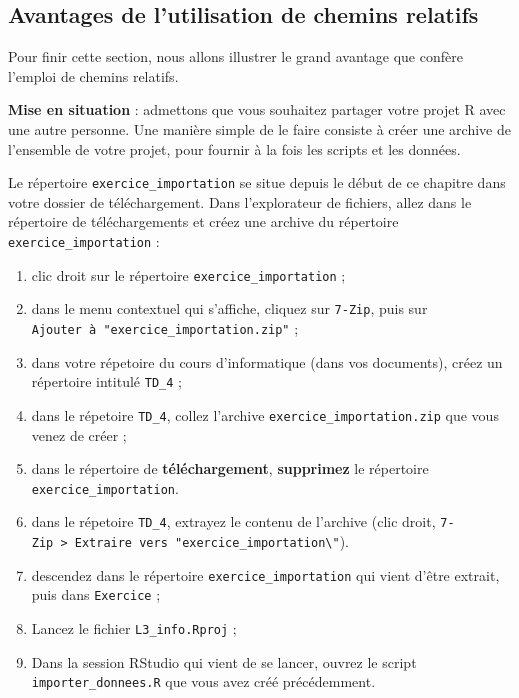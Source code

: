 \documentclass[
  11pt,
]{book}
\providecommand{\tightlist}{%
  \setlength{\itemsep}{0pt}\setlength{\parskip}{0pt}}
\numberwithin{equation}{section}
\numberwithin{countremarque}{section}
\newenvironment{greenbox}{
  \begin{tcolorbox}[breakable, colback=vert,coltext=black,
                  colframe=grisfonce]}
 {\end{tcolorbox}}
\begin{document}
\hypertarget{avantages-de-lutilisation-de-chemins-relatifs}{%
\subsection{Avantages de l'utilisation de chemins relatifs}\label{avantages-de-lutilisation-de-chemins-relatifs}}

Pour finir cette section, nous allons illustrer le grand avantage que confère l'emploi de chemins relatifs.

\textbf{Mise en situation} : admettons que vous souhaitez partager votre projet R avec une autre personne. Une manière simple de le faire consiste à créer une archive de l'ensemble de votre projet, pour fournir à la fois les scripts et les données.

Le répertoire \texttt{exercice\_importation} se situe depuis le début de ce chapitre dans votre dossier de téléchargement. Dans l'explorateur de fichiers, allez dans le répertoire de téléchargements et créez une archive du répertoire \texttt{exercice\_importation} :

\begin{greenbox}

\begin{enumerate}
\def\labelenumi{\arabic{enumi}.}
\setcounter{enumi}{11}
\tightlist
\item
  clic droit sur le répertoire \texttt{exercice\_importation} ;
\item
  dans le menu contextuel qui s'affiche, cliquez sur \texttt{7-Zip}, puis sur \texttt{Ajouter\ à\ "exercice\_importation.zip"} ;
\item
  dans votre répetoire du cours d'informatique (dans vos documents), créez un répertoire intitulé \texttt{TD\_4} ;
\item
  dans le répetoire \texttt{TD\_4}, collez l'archive \texttt{exercice\_importation.zip} que vous venez de créer ;
\item
  dans le répertoire de \textbf{téléchargement}, \textbf{supprimez} le répertoire \texttt{exercice\_importation}.
\item
  dans le répetoire \texttt{TD\_4}, extrayez le contenu de l'archive (clic droit, \texttt{7-Zip\ \textgreater{}\ Extraire\ vers\ "exercice\_importation\textbackslash{}"}).
\item
  descendez dans le répertoire \texttt{exercice\_importation} qui vient d'être extrait, puis dans \texttt{Exercice} ;
\item
  Lancez le fichier \texttt{L3\_info.Rproj} ;
\item
  Dans la session RStudio qui vient de se lancer, ouvrez le script \texttt{importer\_donnees.R} que vous avez créé précédemment.
\end{enumerate}

\end{greenbox}
\end{document}
